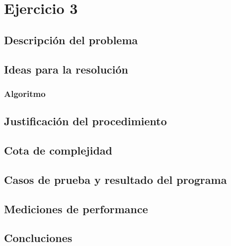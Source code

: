 \section{Ejercicio 3}

\subsection{Descripci\'on del problema} \label{ej_3:descripcion}

\subsection{Ideas para la resoluci\'on} \label{ej_3:idea}

\subsubsection{Algoritmo} \label{ej_3:algoritmo}

\subsection{Justificaci\'on del procedimiento} \label{ej_3:justificacion}

\subsection{Cota de complejidad} \label{ej_3:cota}

\subsection{Casos de prueba y resultado del programa} \label{ej_3:casos}

\subsection{Mediciones de performance} \label{ej_3:performance}

\subsection{Concluciones} \label{ej_3:concluciones}

